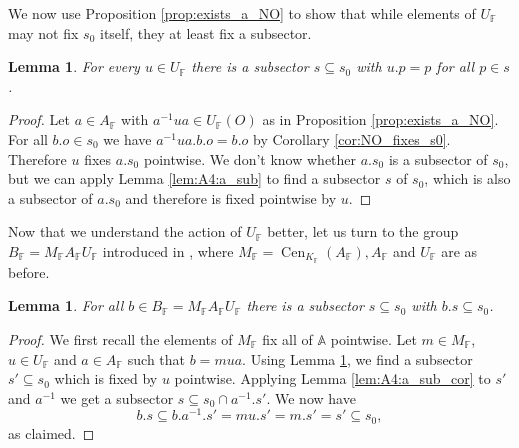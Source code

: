\documentclass[12pt]{amsart}
\newcommand{\F}{\mathbb{F} }
\newcommand{\R}{\mathbb{R} }
\newcommand{\N}{\mathbb{N} }
\newcommand{\A}{\mathbb{A}}
\numberwithin{equation}{section}
\newtheorem{lemma}[theorem]{Lemma}
\theoremstyle{remark} %
\begin{document}
		We now use Proposition \ref{prop:exists_a_NO} to show that while elements of $U_\F$ may not fix $s_0$ itself, they at least fix a subsector.
		\begin{lemma}\label{lem:N_fixes_subsector}
			For every $u\in U_\F$ there is a subsector $s\subseteq s_0$ with $u.p=p$ for all $p\in s$.	
		\end{lemma} 
		\begin{proof}
			Let $a\in A_\F$ with $ a^{-1}ua \in U_\F(O)$ as in Proposition \ref{prop:exists_a_NO}. For all $b.o \in s_0$ we have $a^{-1}ua.b.o = b.o$ by Corollary \ref{cor:NO_fixes_s0}.
			Therefore $u$ fixes $a.s_0$ pointwise. We don't know whether $a.s_0$ is a subsector of $s_0$, but we can apply Lemma \ref{lem:A4:a_sub} to find a subsector $s$ of $s_0$, which is also a subsector of $a.s_0$ and therefore is fixed pointwise by $u$. 
		\end{proof}
		Now that we understand the action of $U_\F$ better, let us turn to the group $B_\F=M_\F A_\F U_\F$ introduced in \cite[Section \ref{I-sec:BWB}]{AppAGRCF}, where $M_\F=\operatorname{Cen}_{K_\F}(A_\F) ,
		A_\F$ and $U_\F$ are as before.
		\begin{lemma}\label{lem:A4:B_acts}
			For all $b\in B_\F = M_\F A_\F U_\F$ there is a subsector $s\subseteq s_0$ with $b.s \subseteq s_0$.
		\end{lemma}
		\begin{proof}
			We first recall the elements of $M_\F$ fix all of $\A$ pointwise. Let $m\in M_\F$, $u \in U_\F$ and $a\in A_\F$ such that $b=mua$. Using Lemma \ref{lem:N_fixes_subsector}, we find a subsector $s'\subseteq s_0$ which is fixed by $u$ pointwise. Applying Lemma \ref{lem:A4:a_sub_cor} to $s'$ and $a^{-1}$ we get a subsector $s\subseteq s_0 \cap a^{-1}.s'$. We now have
			$$
			b.s \subseteq b.a^{-1}.s' = m u .s' = m .s' = s' \subseteq s_0,
			$$
			as claimed.
		\end{proof}
\end{document}
